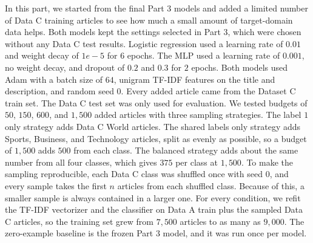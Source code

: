 \documentclass[letterpaper,conference,compsoc,onecolumn]{IEEEtran}
\begin{document}
In this part, we started from the final Part $3$ models and added a limited number of Data C training articles to see how much a small amount of target-domain data helps. Both models kept the settings selected in Part $3$, which were chosen without any Data C test results. Logistic regression used a learning rate of $0.01$ and weight decay of $1e-5$ for $6$ epochs. The MLP used a learning rate of $0.001$, no weight decay, and dropout of $0.2$ and $0.3$ for $2$ epochs. Both models used Adam with a batch size of $64$, unigram TF-IDF features on the title and description, and random seed $0$. Every added article came from the Dataset C train set. The Data C test set was only used for evaluation.
We tested budgets of $50$, $150$, $600$, and $1,500$ added articles with three sampling strategies. The label $1$ only strategy adds Data C World articles. The shared labels only strategy adds Sports, Business, and Technology articles, split as evenly as possible, so a budget of $1,500$ adds $500$ from each class. The balanced strategy adds about the same number from all four classes, which gives $375$ per class at $1,500$. To make the sampling reproducible, each Data C class was shuffled once with seed $0$, and every sample takes the first $n$ articles from each shuffled class. Because of this, a smaller sample is always contained in a larger one. For every condition, we refit the TF-IDF vectorizer and the classifier on Data A train plus the sampled Data C articles, so the training set grew from $7,500$ articles to as many as $9,000$. The zero-example baseline is the frozen Part $3$ model, and it was run once per model.
\end{document}
